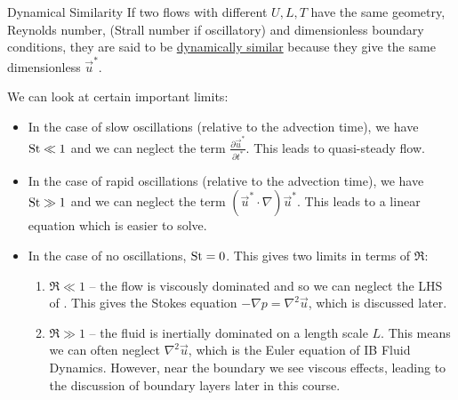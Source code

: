 \documentclass[../Main.tex]{subfiles}
\begin{document}
\begin{definition}{Dynamical Similarity}
    If two flows with different $U, L, T$ have the same geometry, Reynolds number, (Strall number if oscillatory) and dimensionless boundary conditions, they are said to be \underline{dynamically similar} because they give the same dimensionless $\vec{u}^*$.
\end{definition}

We can look at certain important limits:
\begin{itemize}
    \item In the case of slow oscillations (relative to the advection time), we have $\operatorname{St} \ll 1$ and we can neglect the term $\frac{\partial \vec{u}^*}{\partial t^*}$. This leads to quasi-steady flow.
    \item In the case of rapid oscillations (relative to the advection time), we have $\operatorname{St} \gg 1$ and we can neglect the term $(\vec{u}^* \cdot \nabla)\vec{u}^*$. This leads to a linear equation which is easier to solve.
    \item In the case of no oscillations, $\operatorname{St} = 0$. This gives two limits in terms of $\Re$:
        \begin{enumerate}
            \item $\Re \ll 1$ -- the flow is viscously dominated and so we can neglect the LHS of . This gives the Stokes equation $-\nabla p = \nabla^2\vec{u}$, which is discussed later.
            \item $\Re \gg 1$ -- the fluid is inertially dominated on a length scale $L$. This means we can often neglect $\nabla^2 \vec{u}$, which is the Euler equation of IB Fluid Dynamics. However, near the boundary we see viscous effects, leading to the discussion of boundary layers later in this course.
        \end{enumerate}
\end{itemize}
\end{document}
